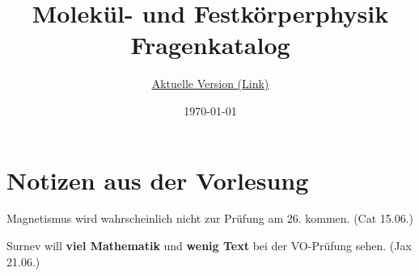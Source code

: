 \documentclass[a4paper, 11pt, ngerman, parskip=half-]{scrartcl}
\title{Molekül- und Festkörperphysik\\Fragenkatalog}
\subtitle{\href{https://github.com/Bierbunker/MoF-Ausarbeitung}{\underline{Aktuelle Version (Link)}}}
\date{\today}
\begin{document}
\maketitle

\newpage

\tableofcontents
\newpage
\section{Notizen aus der Vorlesung}
Magnetismus wird wahrscheinlich nicht zur Prüfung am 26. kommen. (Cat 15.06.)

Surnev will \textbf{viel Mathematik} und \textbf{wenig Text} bei der VO-Prüfung sehen. (Jax 21.06.)

\newpage








\end{document}
